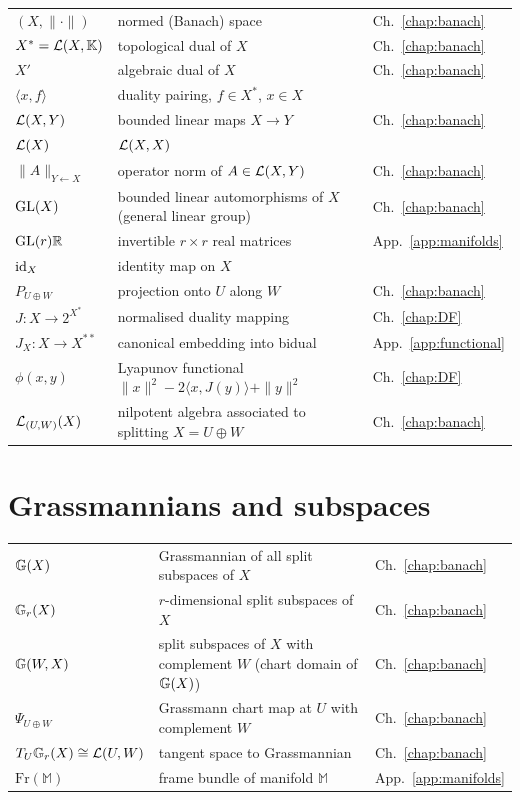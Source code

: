 \begin{tabular}{@{}p{4.5cm}p{7cm}l@{}}
$(X, \|\cdot\|)$ & normed (Banach) space & Ch.~\ref{chap:banach} \\
$X^* = \mathcal{L}(X,\mathbb{K})$ & topological dual of $X$ & Ch.~\ref{chap:banach} \\
$X'$ & algebraic dual of $X$ & Ch.~\ref{chap:banach} \\
$\langle x, f \rangle$ & duality pairing, $f \in X^*$, $x \in X$ & \\
$\mathcal{L}(X,Y)$ & bounded linear maps $X \to Y$ & Ch.~\ref{chap:banach} \\
$\mathcal{L}(X)$ & $\mathcal{L}(X,X)$ & \\
$\|A\|_{Y \leftarrow X}$ & operator norm of $A \in \mathcal{L}(X,Y)$
    & Ch.~\ref{chap:banach} \\
$\mathrm{GL}(X)$ & bounded linear automorphisms of $X$ (general linear group)
    & Ch.~\ref{chap:banach} \\
$\mathrm{GL}(r){\mathbb{R}}$ & invertible $r \times r$ real matrices
    & App.~\ref{app:manifolds} \\
$\mathrm{id}_{X}$ & identity map on $X$ & \\
$P_{U \oplus W}$ & projection onto $U$ along $W$
    & Ch.~\ref{chap:banach} \\
$J: X \to 2^{X^*}$ & normalised duality mapping & Ch.~\ref{chap:DF} \\
$J_X: X \to X^{**}$ & canonical embedding into bidual
    & App.~\ref{app:functional} \\
$\phi(x,y)$ & Lyapunov functional
    $\|x\|^2 - 2\langle x,J(y)\rangle + \|y\|^2$
    & Ch.~\ref{chap:DF} \\
$\mathcal{L}_{(U,W)}(X)$ & nilpotent algebra associated to splitting $X=U\oplus W$
    & Ch.~\ref{chap:banach} \\
\end{tabular}

\section*{Grassmannians and subspaces}

\begin{tabular}{@{}p{4.5cm}p{7cm}l@{}}
$\mathbb{G}(X)$ & Grassmannian of all split subspaces of $X$
    & Ch.~\ref{chap:banach} \\
$\mathbb{G}_{r}(X)$ & $r$-dimensional split subspaces of $X$
    & Ch.~\ref{chap:banach} \\
$\mathbb{G}(W,X)$ & split subspaces of $X$ with complement $W$
    (chart domain of $\mathbb{G}(X)$) & Ch.~\ref{chap:banach} \\
$\Psi_{U \oplus W}$ & Grassmann chart map at $U$ with complement $W$
    & Ch.~\ref{chap:banach} \\
$T_U \mathbb{G}_{r}(X) \cong \mathcal{L}(U,W)$ & tangent space to Grassmannian
    & Ch.~\ref{chap:banach} \\
$\mathrm{Fr}(\mathbb{M})$ & frame bundle of manifold $\mathbb{M}$
    & App.~\ref{app:manifolds} \\
\end{tabular}

